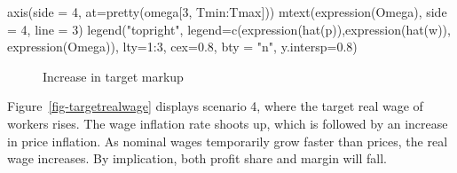 \documentclass[
  letterpaper,
  DIV=11,
  numbers=noendperiod]{scrreprt}
\newenvironment{Shaded}{\begin{snugshade}}{\end{snugshade}}
\newcommand{\AttributeTok}[1]{\textcolor[rgb]{0.40,0.45,0.13}{#1}}
\newcommand{\DecValTok}[1]{\textcolor[rgb]{0.68,0.00,0.00}{#1}}
\newcommand{\FloatTok}[1]{\textcolor[rgb]{0.68,0.00,0.00}{#1}}
\newcommand{\FunctionTok}[1]{\textcolor[rgb]{0.28,0.35,0.67}{#1}}
\newcommand{\NormalTok}[1]{\textcolor[rgb]{0.00,0.23,0.31}{#1}}
\newcommand{\SpecialCharTok}[1]{\textcolor[rgb]{0.37,0.37,0.37}{#1}}
\newcommand{\StringTok}[1]{\textcolor[rgb]{0.13,0.47,0.30}{#1}}
\begin{document}
\begin{Shaded}
\begin{Highlighting}[]
\FunctionTok{axis}\NormalTok{(}\AttributeTok{side =} \DecValTok{4}\NormalTok{, }\AttributeTok{at=}\FunctionTok{pretty}\NormalTok{(omega[}\DecValTok{3}\NormalTok{, Tmin}\SpecialCharTok{:}\NormalTok{Tmax]))  }
\FunctionTok{mtext}\NormalTok{(}\FunctionTok{expression}\NormalTok{(Omega), }\AttributeTok{side =} \DecValTok{4}\NormalTok{, }\AttributeTok{line =} \DecValTok{3}\NormalTok{)}
\FunctionTok{legend}\NormalTok{(}\StringTok{"topright"}\NormalTok{, }\AttributeTok{legend=}\FunctionTok{c}\NormalTok{(}\FunctionTok{expression}\NormalTok{(}\FunctionTok{hat}\NormalTok{(p)),}\FunctionTok{expression}\NormalTok{(}\FunctionTok{hat}\NormalTok{(w)), }\FunctionTok{expression}\NormalTok{(Omega)),}
       \AttributeTok{lty=}\DecValTok{1}\SpecialCharTok{:}\DecValTok{3}\NormalTok{, }\AttributeTok{cex=}\FloatTok{0.8}\NormalTok{, }\AttributeTok{bty =} \StringTok{"n"}\NormalTok{, }\AttributeTok{y.intersp=}\FloatTok{0.8}\NormalTok{)}
\end{Highlighting}
\end{Shaded}

\begin{figure}[H]


\caption{\label{fig-markup}Increase in target markup}

\end{figure}%

Figure~\ref{fig-targetrealwage} displays scenario 4, where the target
real wage of workers rises. The wage inflation rate shoots up, which is
followed by an increase in price inflation. As nominal wages temporarily
grow faster than prices, the real wage increases. By implication, both
profit share and margin will fall.
\end{document}
